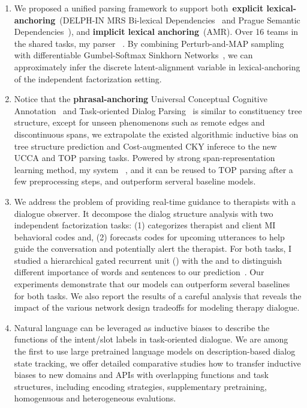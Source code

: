 \begin{enumerate}
\item We proposed a unified parsing framework to support
  both~\textbf{explicit lexical-anchoring}~(DELPH-IN MRS Bi-lexical
  Dependencies~\citep[DM,][]{ivanova2012did} and Prague Semantic
  Dependencies~\citep[PSD,][]{hajic2012announcing,miyao2014house}), and
  \textbf{implicit lexical anchoring}~(AMR). Over 16 teams in the
  shared tasks, my parser~\citet{cao2019amazon} . By combining Perturb-and-MAP
  sampling~\cite{Papandreou2011PerturbandMAPRF} with differentiable
  Gumbel-Softmax Sinkhorn Networks~\cite{Mena2018LearningLP}, we can
  approximately infer the discrete latent-alignment variable in
  lexical-anchoring of the independent factorization setting.

\item Notice that the \textbf{phrasal-anchoring} Universal Conceptual
  Cognitive Annotation~\citep[UCCA,][]{abend2013universal} and
  Task-oriented Dialog
  Parsing~\citep[TOP,][]{gupta-etal-2018-semantic-parsing} is similar
  to constituency tree structure, except for unseen phenomenons such
  as remote edges and discontinuous spans, we extrapolate the existed
  algorithmic inductive bias on tree structure prediction and
  Cost-augmented CKY inferece to the new UCCA and TOP parsing
  tasks. Powered by strong span-representation learning method, my
  system~\citep{cao2019amazon} , and it
  can be reused to TOP parsing after a few preprocessing steps, and
  outperform serveral baseline models.

\item We address the problem of providing real-time guidance to
  therapists with a dialogue observer. It decompose the dialog
  structure analysis with two independent factorization tasks: (1)
  categorizes therapist and client MI behavioral codes and, (2)
  forecasts codes for upcoming utterances to help guide the
  conversation and potentially alert the therapist. For both tasks, I
  studied a hierarchical gated recurrent unit (\HGRU) with the
   and  to
  distinguish different importance of words and sentences to our
  prediction~\cite{jie2019psycdialacl}. Our experiments demonstrate
  that our models can outperform several baselines for both tasks.  We
  also report the results of a careful analysis that reveals the
  impact of the various network design tradeoffs for modeling therapy
  dialogue.

\item Natural language can be leveraged as inductive biases to
  describe the functions of the intent/slot labels in task-oriented
  dialogue. We are among the first to use large pretrained language
  models on description-based dialog state tracking, we offer detailed
  comparative studies how to transfer inductive biases to new domains
  and APIs with overlapping functions and task structures, including
  encoding strategies, supplementary pretraining, homogenuous and
  heterogeneous evalutions.
\end{enumerate}



